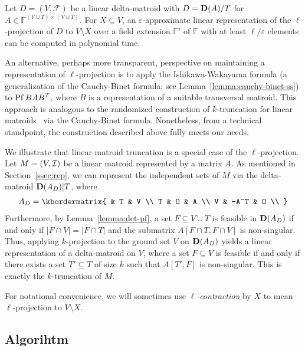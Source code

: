 \begin{lemma}
  \label{lemma:reduce}
  Let $D = (V, \mathcal{F})$ be a linear delta-matroid with $D = \mathbf D(A) / T$ for $A \in \mathbb{F}^{(V \cup T) \times (V \cup T)}$. 
  For $X \subseteq V$, an $\varepsilon$-approximate linear representation of the $\ell$-projection of $D$ to $V \setminus X$ over a field extension $\mathbb{F}'$ of $\mathbb{F}$ with at least $\ell / \varepsilon$ elements can be computed in polynomial time.
\end{lemma}

An alternative, perhaps more transparent, perspective on maintaining a representation of $\ell$-projection is to apply the Ishikawa-Wakayama formula (a generalization of the Cauchy-Binet formula; see Lemma~\ref{lemma:cauchy-binet-ss}) to $\operatorname{Pf} BAB^T$,
where $B$ is a representation of a suitable transversal matroid.  
This approach is analogous to the randomized construction of $k$-truncation for linear matroids~\cite{Marx09-matroid} via the Cauchy-Binet formula.  
Nonetheless, from a technical standpoint, the construction described above fully meets our needs.

We illustrate that linear matroid truncation is a special case of the $\ell$-projection.
Let $M = (V, \mathcal I)$ be a linear matroid represented by a matrix $A$.
As mentioned in Section~\ref{ssec:rep}, we can represent the independent sets of $M$ via the delta-matroid $\mathbf D(A_D)|T$, where
\begin{align*}
  A_D = \kbordermatrix{
    & T & V \\
    T & O & A \\
    V & -A^T & O \\
  }
\end{align*}
Furthermore, by Lemma~\ref{lemma:det-pf}, a set $F \subseteq V \cup T$ is feasible in $\mathbf D(A_D)$ if and only if $|F \cap V| = |F \cap T|$ and the submatrix $A[F \cap T, F \cap V]$ is non-singular.
Thus, applying $k$-projection to the ground set $V$ on $\mathbf D(A_D)$ yields a linear representation of a delta-matroid on $V$, where a set $F \subseteq V$ is feasible if and only if there exists a set $T' \subseteq T$ of size $k$ such that $A[T', F]$ is non-singular.
This is exactly the $k$-truncation of $M$.

For notational convenience, we will sometimes use \emph{$\ell$-contraction} by $X$ to mean $\ell$-projection to $V \setminus X$.

\subsection{Algorihtm}

